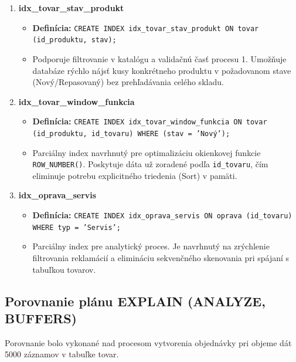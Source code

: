 \documentclass[11pt, a4paper]{article}
\begin{document}
\begin{enumerate}
    \item \textbf{idx\_tovar\_stav\_produkt}

    \begin{itemize}
        \item \textbf{Definícia:} \texttt{CREATE INDEX idx\_tovar\_stav\_produkt ON tovar (id\_produktu, stav);}
        \item Podporuje filtrovanie v katalógu a validačnú časť procesu 1. Umožňuje databáze rýchlo nájsť kusy konkrétneho produktu v požadovanom stave (Nový/Repasovaný) bez prehľadávania celého skladu.
    \end{itemize}
    
    \item \textbf{idx\_tovar\_window\_funkcia}

    \begin{itemize}
        \item \textbf{Definícia:} \texttt{CREATE INDEX idx\_tovar\_window\_funkcia ON tovar (id\_produktu, id\_tovaru) WHERE (stav = 'Nový');}
        \item Parciálny index navrhnutý pre optimalizáciu okienkovej funkcie \texttt{ROW\_NUMBER()}. Poskytuje dáta už zoradené podľa \texttt{id\_tovaru}, čím eliminuje potrebu explicitného triedenia (Sort) v pamäti.
    \end{itemize}

    \item \textbf{idx\_oprava\_servis}

    \begin{itemize}
        \item \textbf{Definícia:} \texttt{CREATE INDEX idx\_oprava\_servis ON oprava (id\_tovaru) WHERE typ = 'Servis';}
        \item Parciálny index pre analytický proces. Je navrhnutý na zrýchlenie filtrovania reklamácií a elimináciu sekvenčného skenovania pri spájaní s tabuľkou tovarov.
    \end{itemize}
    
\end{enumerate}


\subsection{Porovnanie plánu EXPLAIN (ANALYZE, BUFFERS)}
Porovnanie bolo vykonané nad procesom vytvorenia objednávky pri objeme dát 5000 záznamov v tabuľke tovar.
\end{document}
